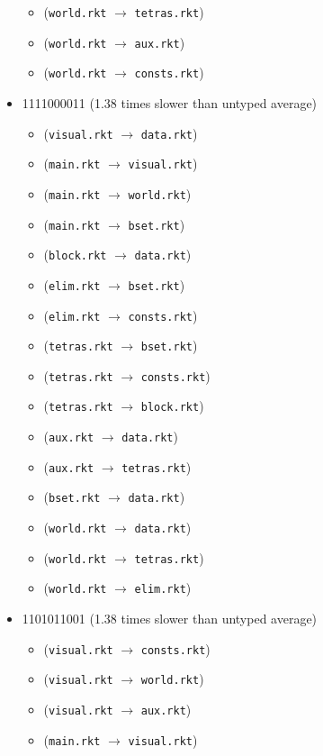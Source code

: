 \documentclass{article}
\newcommand{\mono}[1]{\texttt{#1}}
\begin{document}
\begin{itemize}
\begin{itemize}
  \item (\mono{world.rkt} $\rightarrow$ \mono{tetras.rkt})
  \item (\mono{world.rkt} $\rightarrow$ \mono{aux.rkt})
  \item (\mono{world.rkt} $\rightarrow$ \mono{consts.rkt})
  \end{itemize}
\item 1111000011 (1.38 times slower than untyped average)
  \begin{itemize}
  \item (\mono{visual.rkt} $\rightarrow$ \mono{data.rkt})
  \item (\mono{main.rkt} $\rightarrow$ \mono{visual.rkt})
  \item (\mono{main.rkt} $\rightarrow$ \mono{world.rkt})
  \item (\mono{main.rkt} $\rightarrow$ \mono{bset.rkt})
  \item (\mono{block.rkt} $\rightarrow$ \mono{data.rkt})
  \item (\mono{elim.rkt} $\rightarrow$ \mono{bset.rkt})
  \item (\mono{elim.rkt} $\rightarrow$ \mono{consts.rkt})
  \item (\mono{tetras.rkt} $\rightarrow$ \mono{bset.rkt})
  \item (\mono{tetras.rkt} $\rightarrow$ \mono{consts.rkt})
  \item (\mono{tetras.rkt} $\rightarrow$ \mono{block.rkt})
  \item (\mono{aux.rkt} $\rightarrow$ \mono{data.rkt})
  \item (\mono{aux.rkt} $\rightarrow$ \mono{tetras.rkt})
  \item (\mono{bset.rkt} $\rightarrow$ \mono{data.rkt})
  \item (\mono{world.rkt} $\rightarrow$ \mono{data.rkt})
  \item (\mono{world.rkt} $\rightarrow$ \mono{tetras.rkt})
  \item (\mono{world.rkt} $\rightarrow$ \mono{elim.rkt})
  \end{itemize}
\item 1101011001 (1.38 times slower than untyped average)
  \begin{itemize}
  \item (\mono{visual.rkt} $\rightarrow$ \mono{consts.rkt})
  \item (\mono{visual.rkt} $\rightarrow$ \mono{world.rkt})
  \item (\mono{visual.rkt} $\rightarrow$ \mono{aux.rkt})
  \item (\mono{main.rkt} $\rightarrow$ \mono{visual.rkt})

\end{itemize}
\end{itemize}
\end{document}
